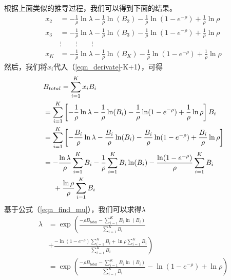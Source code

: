 根据上面类似的推导过程，我们可以得到下面的结果。
\begin{equation*}
\begin{split}
x_2 &= -\frac{1}{\rho}\ln \lambda - \frac{1}{\rho} \ln (B_2) -
\frac{1}{\rho} \ln (1-e^{-\rho}) + \frac{1}{\rho} \ln
\rho \\
x_3 &=-\frac{1}{\rho} \ln \lambda- \frac{1}{\rho} \ln (B_3) -
\frac{1}{\rho} \ln (1-e^{-\rho}) + \frac{1}{\rho} \ln
\rho\\
\nonumber &\vdots \qquad \vdots \qquad \vdots \\
x_K &=-\frac{1}{\rho} \ln \lambda- \frac{1}{\rho} \ln (B_K) -
\frac{1}{\rho} \ln (1-e^{-\rho}) + \frac{1}{\rho} \ln \rho
\end{split}
\end{equation*}
然后，我们将$x_i$代入（\ref{eqn_derivate}-K+1），可得
\begin{equation}
\begin{split}
&B_{total} = \sum_{i=1}^K x_i B_i \\
&= \sum^K_{i=1}\left[- \frac{1}{\rho}\ln \lambda - \frac{1}{\rho}
\ln (B_i) - \frac{1}{\rho} \ln (1-e^{-\rho}) + \frac{1}{\rho}
\ln
\rho \right] B_i\\
&= \sum^K_{i=1}\left[- \frac{B_i}{\rho} \ln \lambda -
\frac{B_i}{\rho} \ln (B_i) - \frac{B_i}{\rho} \ln (1-e^{-\rho})
+ \frac{B_i}{\rho} \ln
\rho \right]\\
&= -\frac{\ln \lambda}{\rho} \sum^K_{i=1} B_i - \frac{1}{\rho}
\sum^K_{i=1} B_i \ln (B_i)- \frac{\ln(1-e^{-\rho})}{\rho}
\sum_{i=1}^K B_i \\ & \hspace{5mm}+ \frac{ \ln \rho} {\rho} \sum^K_{i=1} B_i
\end{split}
\label{eqn_find_mu}
\end{equation}
基于公式（\ref{eqn_find_mu}），我们可以求得$\lambda$
\begin{equation*}
\begin{split}
\lambda &= \exp \left( \frac{-\rho B_{total} - \sum^K_{i=1} B_i \ln
(B_i) }{\sum^K_{i=1}B_i} \right.\\
&+ \left. \frac{ - \ln(1-e^{-\rho}) \sum^K_{i=1}B_i + \ln \rho
\sum^K_{i=1}B_i}{\sum^K_{i=1}B_i} \right)\\
&= \exp \left( \frac{-\rho B_{total} - \sum^K_{i=1} B_i \ln
(B_i) }{\sum^K_{i=1}B_i} - \ln(1-e^{-\rho}) + \ln \rho \right)
\end{split}
\end{equation*}

